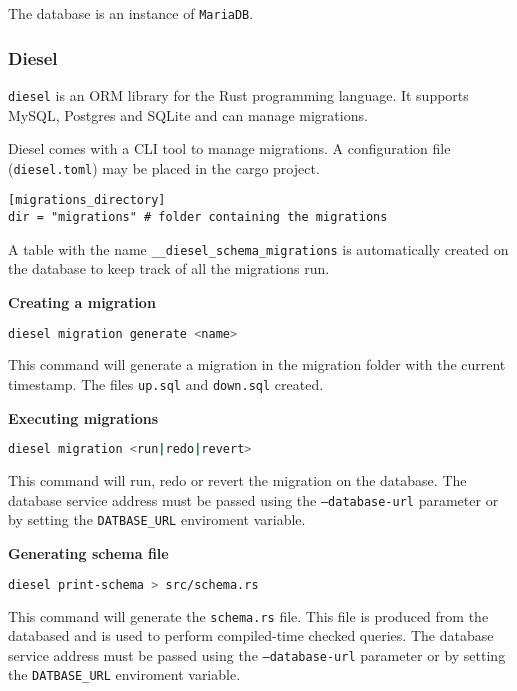\documentclass[../documentation.tex]{subfiles}
\begin{document}
The database is an instance of \texttt{MariaDB}.

\subsubsection{Diesel}

\texttt{diesel} is an ORM library for the Rust programming language.
It supports MySQL, Postgres and SQLite and can manage migrations.

Diesel comes with a CLI tool to manage migrations.
A configuration file (\texttt{diesel.toml}) may be placed in the cargo project.

\begin{lstlisting}
[migrations_directory]
dir = "migrations" # folder containing the migrations
\end{lstlisting}

A table with the name \texttt{\_\_diesel\_schema\_migrations}
is automatically created on the database to keep track of all the migrations
run.


\textbf{Creating a migration}
\begin{lstlisting}[language=bash]
    diesel migration generate <name>
\end{lstlisting}
This command will generate a migration in the migration folder with the current timestamp.
The files \texttt{up.sql} and \texttt{down.sql} created.

\textbf{Executing migrations}
\begin{lstlisting}[language=bash]
    diesel migration <run|redo|revert>
\end{lstlisting}
This command will run, redo or revert the migration on the database.
The database service address must be passed using
the \texttt{--database-url} parameter or by setting the \texttt{DATBASE\_URL}
enviroment variable.

\textbf{Generating schema file}
\begin{lstlisting}[language=bash]
    diesel print-schema > src/schema.rs
\end{lstlisting}
This command will generate the \texttt{schema.rs} file.
This file is produced from the databased and is used to
perform compiled-time checked queries.
The database service address must be passed using
the \texttt{--database-url} parameter or by setting the \texttt{DATBASE\_URL}
enviroment variable.
\end{document}
